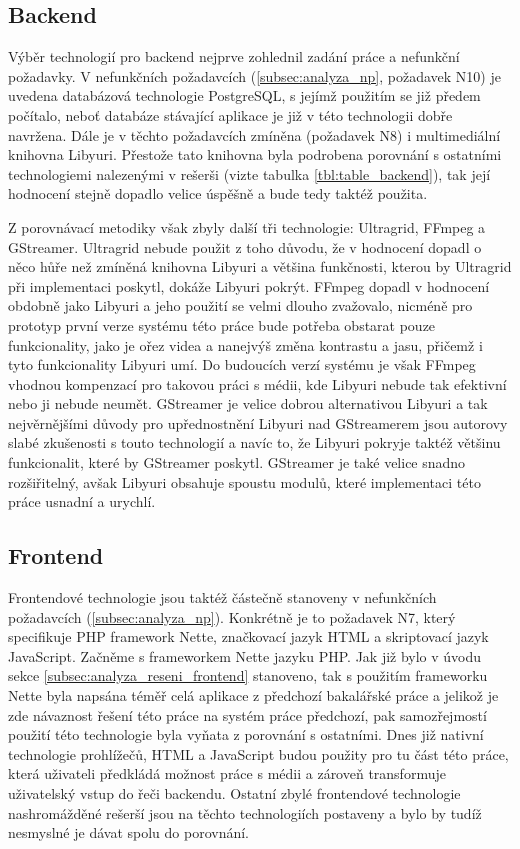 \documentclass[thesis=M,czech]{FITthesis}[2012/06/26]
\begin{document}
\subsection{Backend} \label{subsec:analyza_technologie_vybrane_backend}
Výběr technologií pro backend nejprve zohlednil zadání práce a nefunkční požadavky. V nefunkčních požadavcích (\ref{subsec:analyza_np}, požadavek N10) je uvedena databázová technologie PostgreSQL, s jejímž použitím se již předem počítalo, neboť databáze stávající aplikace je již v této technologii dobře navržena. Dále je v těchto požadavcích zmíněna (požadavek N8) i multimediální knihovna Libyuri. Přestože tato knihovna byla podrobena porovnání s ostatními technologiemi nalezenými v rešerši (vizte tabulka \ref{tbl:table_backend}), tak její hodnocení stejně dopadlo velice úspěšně a bude tedy taktéž použita. 

Z porovnávací metodiky však zbyly další tři technologie: Ultragrid, FFmpeg a GStreamer. Ultragrid nebude použit z toho důvodu, že v hodnocení dopadl o něco hůře než zmíněná knihovna Libyuri a většina funkčnosti, kterou by Ultragrid při implementaci poskytl, dokáže Libyuri pokrýt. FFmpeg dopadl v hodnocení obdobně jako Libyuri a jeho použití se velmi dlouho zvažovalo, nicméně pro prototyp první verze systému této práce bude potřeba obstarat pouze funkcionality, jako je ořez videa a nanejvýš změna kontrastu a jasu, přičemž i tyto funkcionality Libyuri umí. Do budoucích verzí systému je však FFmpeg vhodnou kompenzací pro takovou práci s médii, kde Libyuri nebude tak efektivní nebo ji nebude neumět. GStreamer je velice dobrou alternativou Libyuri a tak nejvěrnějšími důvody pro upřednostnění Libyuri nad GStreamerem jsou autorovy slabé zkušenosti s touto technologií a navíc to, že Libyuri pokryje taktéž většinu funkcionalit, které by GStreamer poskytl. GStreamer je také velice snadno rozšiřitelný, avšak Libyuri obsahuje spoustu modulů, které implementaci této práce usnadní a urychlí.

\subsection{Frontend} \label{subsec:analyza_technologie_vybrane_frontend}
Frontendové technologie jsou taktéž částečně stanoveny v nefunkčních požadavcích (\ref{subsec:analyza_np}). Konkrétně je to požadavek N7, který specifikuje PHP framework Nette, značkovací jazyk HTML a skriptovací jazyk JavaScript. Začněme s frameworkem Nette jazyku PHP. Jak již bylo v úvodu sekce \ref{subsec:analyza_reseni_frontend} stanoveno, tak s použitím frameworku Nette byla napsána téměř celá aplikace z předchozí bakalářské práce a jelikož je zde návaznost řešení této práce na systém práce předchozí, pak samozřejmostí použití této technologie byla vyňata z porovnání s ostatními. Dnes již nativní technologie prohlížečů, HTML a JavaScript budou použity pro tu část této práce, která uživateli předkládá možnost práce s médii a zároveň transformuje uživatelský vstup do řeči backendu. Ostatní zbylé frontendové technologie nashromážděné rešerší jsou na těchto technologiích postaveny a bylo by tudíž nesmyslné je dávat spolu do porovnání. 
\end{document}
